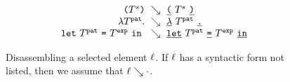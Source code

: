 \begin{figure}
  \newcommand{\dd}{\searrow}
  \[
    \arraycolsep=3pt
    \begin{array}{rcl}
      \sparen{\tiles^s} & \dd & \shardlit{\texttt{(}}~\tiles^s~\shardlit{\texttt{)}} \\
      \slam{\tiles^{\pat}} & \dd & \shardlit{\lambda}~\tiles^{\pat}~\shardlit{\texttt{.}} \\
      \slet{\tiles^{\pat}}{\tiles^{\expr}}{} & \dd & \shardlit{\texttt{let}}~\tiles^{\pat}~\shardlit{\texttt{=}}~\tiles^{\expr}~\shardlit{\texttt{in}}
  \end{array}\]
  \caption{
    Disassembling a selected element $\ell$.
    If $\ell$ has a syntactic form not listed, then we assume that $\ell \searrow \cdot$.
  }
  \label{fig:disassemble-tile}
\end{figure}